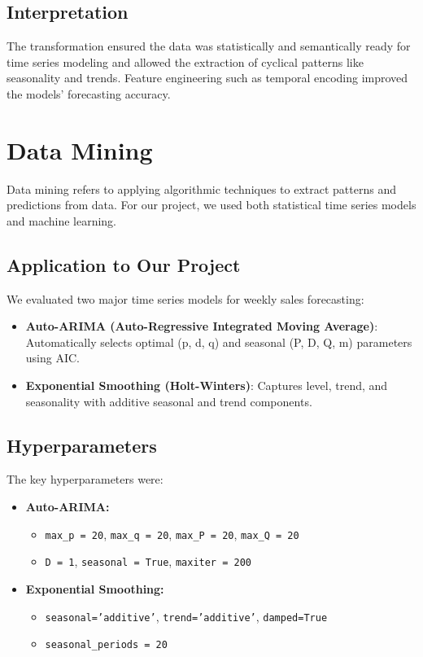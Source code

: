 \subsection{Interpretation}

The transformation ensured the data was statistically and semantically ready for time series modeling and allowed the extraction of cyclical patterns like seasonality and trends. Feature engineering such as temporal encoding improved the models’ forecasting accuracy.

\section{Data Mining}

Data mining refers to applying algorithmic techniques to extract patterns and predictions from data. For our project, we used both statistical time series models and machine learning.

\subsection{Application to Our Project}

We evaluated two major time series models for weekly sales forecasting:

\begin{itemize}
	\item \textbf{Auto-ARIMA (Auto-Regressive Integrated Moving Average)}: Automatically selects optimal (p, d, q) and seasonal (P, D, Q, m) parameters using AIC.
	\item \textbf{Exponential Smoothing (Holt-Winters)}: Captures level, trend, and seasonality with additive seasonal and trend components.
\end{itemize}

\subsection{Hyperparameters}

The key hyperparameters were:

\begin{itemize}
	\item \textbf{Auto-ARIMA:}
	\begin{itemize}
		\item \texttt{max\_p = 20}, \texttt{max\_q = 20}, \texttt{max\_P = 20}, \texttt{max\_Q = 20}
		\item \texttt{D = 1}, \texttt{seasonal = True}, \texttt{maxiter = 200}
	\end{itemize}
	\item \textbf{Exponential Smoothing:}
	\begin{itemize}
		\item \texttt{seasonal='additive'}, \texttt{trend='additive'}, \texttt{damped=True}
		\item \texttt{seasonal\_periods = 20}
	\end{itemize}
\end{itemize}

